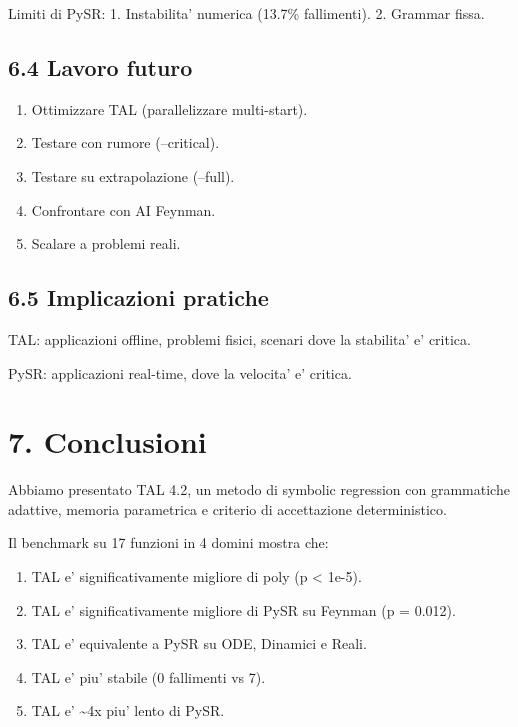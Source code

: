 \documentclass[
]{article}
\providecommand{\tightlist}{%
  \setlength{\itemsep}{0pt}\setlength{\parskip}{0pt}}
\begin{document}
Limiti di PySR: 1. Instabilita' numerica (13.7\% fallimenti). 2. Grammar
fissa.

\subsection{6.4 Lavoro futuro}\label{lavoro-futuro}

\begin{enumerate}
\def\labelenumi{\arabic{enumi}.}
\tightlist
\item
  Ottimizzare TAL (parallelizzare multi-start).
\item
  Testare con rumore (--critical).
\item
  Testare su extrapolazione (--full).
\item
  Confrontare con AI Feynman.
\item
  Scalare a problemi reali.
\end{enumerate}

\subsection{6.5 Implicazioni pratiche}\label{implicazioni-pratiche}

TAL: applicazioni offline, problemi fisici, scenari dove la stabilita'
e' critica.

PySR: applicazioni real-time, dove la velocita' e' critica.

\section{7. Conclusioni}\label{conclusioni}

Abbiamo presentato TAL 4.2, un metodo di symbolic regression con
grammatiche adattive, memoria parametrica e criterio di accettazione
deterministico.

Il benchmark su 17 funzioni in 4 domini mostra che:

\begin{enumerate}
\def\labelenumi{\arabic{enumi}.}
\tightlist
\item
  TAL e' significativamente migliore di poly (p \textless{} 1e-5).
\item
  TAL e' significativamente migliore di PySR su Feynman (p = 0.012).
\item
  TAL e' equivalente a PySR su ODE, Dinamici e Reali.
\item
  TAL e' piu' stabile (0 fallimenti vs 7).
\item
  TAL e' \textasciitilde4x piu' lento di PySR.
\end{enumerate}
\end{document}
